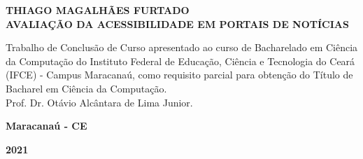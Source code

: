 \documentclass[a4paper]{article}
\begin{document}
\begin{titlepage}
	\vfill
	\begin{center}
		\onehalfspacing
		\fontsize{12pt}{0pt}\selectfont
		{\large \textbf{THIAGO MAGALHÃES FURTADO}} \\[1.5cm]
		\fontsize{12pt}{0pt}\selectfont
		{\large \textbf{AVALIAÇÃO DA ACESSIBILIDADE EM PORTAIS DE NOTÍCIAS}}\\[3cm]
		
		\hspace{.45\textwidth} %
		\begin{minipage}{.5\textwidth}
			\large Trabalho de Conclusão de Curso apresentado ao curso de Bacharelado em Ciência da Computação do Instituto Federal de Educação, Ciência e Tecnologia do Ceará (IFCE) - Campus Maracanaú, como requisito parcial para obtenção do Título de Bacharel em Ciência da Computação.\\[1cm]
			Prof. Dr. Otávio Alcântara de Lima Junior.
		\end{minipage}
		\vfill
		\vspace{2cm}		
		\large \textbf{Maracanaú - CE}
		
		\large \textbf{2021}
	\end{center}
\end{titlepage}
\end{document}
